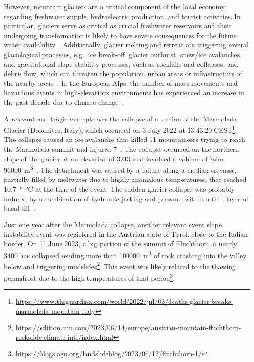 However, mountain glaciers are a critical component of the local economy regarding freshwater supply, hydroelectric production, and tourist activities.
In particular, glaciers serve as critical as crucial freshwater reservoirs and their undergoing transformation is likely to have severe consequences for the future water availability~\citep{Barnett2005, hock2005}. 
Additionally, glacier melting and retreat are triggering several glaciological processes, e.g., ice break-off, glacier outburst, snow/ice avalanches, and gravitational slope stability processes, such as rockfalls and collapses, and debris flow, which can threaten the population, urban areas or infrastructure of the nearby areas~\citep{Kaab2004, Deline2015, Giordan2020}.
In the European Alps, the number of mass movements and hazardous events in high-elevations environments has experienced an increase in the past decade due to climate change~\citep{chiarle2023, Nigrelli2024}.

A relevant and tragic example was the collapse of a section of the Marmolada Glacier (Dolomites, Italy), which occurred on 3 July 2022 at 13:43:20 CEST\footnote{\url{https://www.theguardian.com/world/2022/jul/03/deaths-glacier-breaks-marmolada-mountain-italy}}. 
The collapse caused an ice avalanche that killed 11 mountaineers trying to reach the Marmolada summit and injured 7~\citep{Olivieri2023, Bondesan2023}.
The collapse occurred on the northern slope of the glacier at an elevation of \SI{3213}{\masl} and involved a volume of \SI{\sim 96000}{\cubic\meter}~\citep{Olivieri2023}.
The detachment was caused by a failure along a median crevasse, partially filled by meltwater due to highly anomalous temperatures, that reached \SI{10.7}{\degree\celsius} at the time of the event.
The sudden glacier collapse was probably induced by a combination of hydraulic jacking and pressure within a thin layer of basal till~\citep{Bondesan2023}.

Just one year after the Marmolada collapse, another relevant event slope instability event was registered in the Austrian state of Tyrol, close to the Italian border. 
On 11 June 2023, a big portion of the summit of Fluchthorn, a nearly \SI{3400}{\masl} has collapsed sending more than \SI{100000}{\cubic\meter} of rock crashing into the valley below and triggering mudslides\footnote{\mbox{\url{https://edition.cnn.com/2023/06/14/europe/austrian-mountain-fluchthorn-rockslide-climate-intl/index.html}}}.
This event was likely related to the thawing permafrost due to the high temperatures of that period\footnote{\url{https://blogs.agu.org/landslideblog/2023/06/12/fluchthorn-1/}}.

